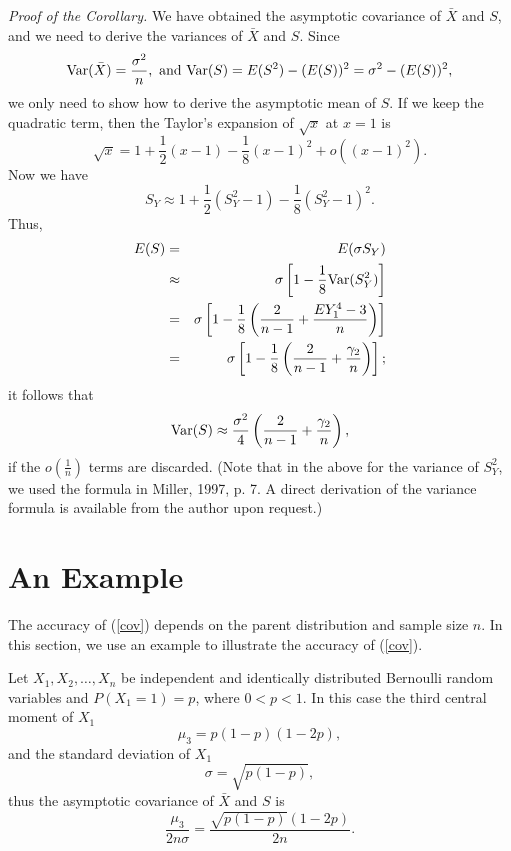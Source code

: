 \documentclass[12pt]{article}
\def\be{\begin{equation}}
\def\ee{\end{equation}}
\begin{document}
\vspace{0.5cm}
\noindent
 {\it Proof of the Corollary.} We have obtained the asymptotic covariance of $\bar{X}$ and $S$, and we need to derive
the variances of $\bar{X}$ and $S$.
 Since
 $$
 \hbox{Var}(\bar{X})=\frac{\sigma^2}{n}, \ \hbox{and}\
 \hbox{Var}(S)=E(S^2)-(E(S))^2=\sigma^2-(E(S))^2,
 $$
 we only need to show how to derive
 the asymptotic mean of $S$. If we keep the quadratic term, then the
 Taylor's expansion of $\sqrt{x}$ at $x=1$ is
 $$
 \sqrt{x}=1+\frac{1}{2}(x-1)-\frac{1}{8}(x-1)^2+o((x-1)^2).
 $$
 Now we have
 $$
 S_Y\approx 1+\frac{1}{2}(S_Y^2-1)-\frac{1}{8}(S_Y^2-1)^2.
 $$
 Thus,
 \begin{eqnarray*}
  E(S)&=&E(\sigma S_Y)\\
      &\approx& \sigma \left[1-\frac{1}{8}\hbox{Var}(S_Y^2)\right]\\
      &=& \sigma\left[1-\frac{1}{8}\left(\frac{2}{n-1}+\frac{EY_1^4-3}{n}\right)\right]\\
      &=&\sigma\left[1-\frac{1}{8}\left(\frac{2}{n-1}+\frac{\gamma_2}{n}\right)
      \right];
 \end{eqnarray*}
it follows that
$$
 \hbox{Var}(S)\approx
 \frac{\sigma^2}{4}\left(\frac{2}{n-1}+\frac{\gamma_2}{n}\right),
$$
if the $o(\frac{1}{n})$ terms are discarded. (Note that in the
above for the variance of $S_Y^2$, we used
the formula in Miller, 1997, p. 7. A direct derivation of the variance formula is available from the author upon request.)

\section{An Example}

The accuracy of (\ref{cov}) depends on the parent distribution and sample size $n$. In this section, we use an example to illustrate the accuracy of (\ref{cov}).

Let $X_1, X_2, \ldots, X_n$ be independent and identically distributed Bernoulli random variables and $P(X_1=1)=p$, where $0<p<1$. In this case the third central moment of $X_1$
$$
\mu_3=p(1-p)(1-2p),
$$
and the standard deviation of $X_1$
$$
\sigma=\sqrt{p(1-p)},
$$
thus the asymptotic covariance of $\bar{X}$ and $S$ is
\be
\frac{\mu_3}{2n\sigma}=\frac{\sqrt{p(1-p)}(1-2p)}{2n}.\label{AsyCovBernou}
\ee
\end{document}
